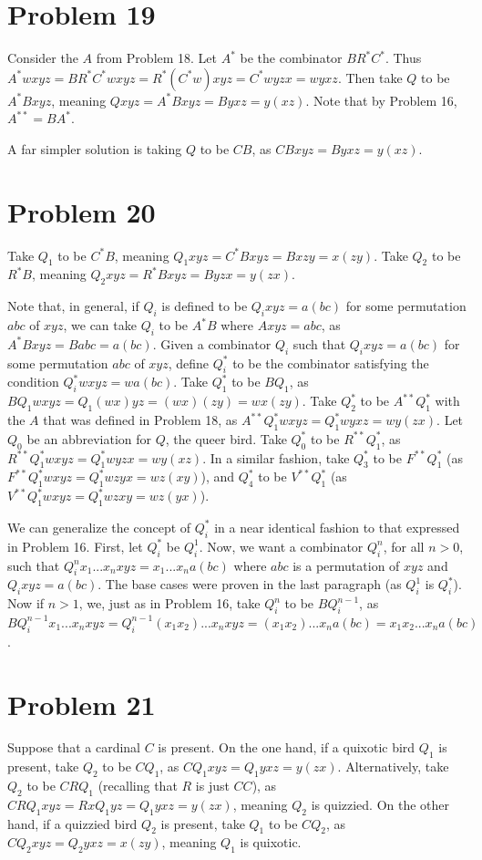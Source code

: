 \documentclass{article}
\theoremstyle{definition}
\begin{document}
\section*{Problem 19}
Consider the $A$ from Problem 18. Let $A^*$ be the combinator $BR^*C^*$. Thus $A^*wxyz=BR^*C^*wxyz=R^*(C^*w)xyz=C^*wyzx=wyxz$. Then take $Q$ to be 
$A^*Bxyz$, meaning $Qxyz=A^*Bxyz=Byxz=y(xz)$. Note that by Problem 16, $A^{**}=BA^*$.


A far simpler solution is taking $Q$ to be $CB$, as $CBxyz=Byxz=y(xz)$.

\section*{Problem 20}
Take $Q_1$ to be $C^*B$, meaning $Q_1xyz=C^*Bxyz=Bxzy=x(zy)$. Take $Q_2$ to be $R^*B$, meaning $Q_2xyz=R^*Bxyz=Byzx=y(zx)$.


Note that, in general, if $Q_i$ is defined to be $Q_ixyz=a(bc)$ for some permutation $abc$ of $xyz$, we can take $Q_i$ to be $A^*B$ where $Axyz=abc$, as 
$A^*Bxyz=Babc=a(bc)$. Given a combinator $Q_i$ such that $Q_ixyz=a(bc)$ for some permutation $abc$ of $xyz$, define $Q_i^*$ to be the combinator satisfying the condition 
$Q_i^*wxyz=wa(bc)$. Take $Q_1^*$ to be $BQ_1$, as $BQ_1wxyz=Q_1(wx)yz=(wx)(zy)=wx(zy)$. Take $Q_2^*$ to be $A^{**}Q_1^*$ with the $A$ that was defined in Problem 18, as 
$A^{**}Q_1^*wxyz=Q_1^*wyxz=wy(zx)$. Let $Q_0$ be an abbreviation for $Q$, the queer bird. Take $Q_0^*$ to be $R^{**}Q_1^*$, as 
$R^{**}Q_1^*wxyz=Q_1^*wyzx=wy(xz)$. In a similar fashion, take $Q_3^*$ to be $F^{**}Q_1^*$ (as $F^{**}Q_1^*wxyz=Q_1^*wzyx=wz(xy)$), 
and $Q_4^*$ to be $V^{**}Q_1^*$ (as $V^{**}Q_1^*wxyz=Q_1^*wzxy=wz(yx)$).


We can generalize the concept of $Q_i^*$ in a near identical fashion to that expressed in Problem 16. First, let $Q_i^*$ be $Q_i^1$. Now, we want a combinator $Q_i^n$, for all 
$n>0$, 
such that $Q_i^nx_1...x_nxyz=x_1...x_na(bc)$ where $abc$ is a permutation of $xyz$ and $Q_ixyz=a(bc)$. The base cases were proven in the last paragraph (as $Q_i^1$ 
is $Q_i^*$). Now if $n>1$, we, just as in Problem 16, take $Q_i^n$ to be $BQ_i^{n-1}$, as 
$BQ_i^{n-1}x_1...x_nxyz=Q_i^{n-1}(x_1x_2)...x_nxyz=(x_1x_2)...x_na(bc)=x_1x_2...x_na(bc)$.

\section*{Problem 21}
Suppose that a cardinal $C$ is present. On the one hand, if a quixotic bird $Q_1$ is present, take $Q_2$ to be $CQ_1$, as $CQ_1xyz=Q_1yxz=y(zx)$. 
Alternatively, take $Q_2$ to be $CRQ_1$ (recalling that $R$ is just $CC$), as 
$CRQ_1xyz=RxQ_1yz=Q_1yxz=y(zx)$, meaning $Q_2$ is quizzied. On the other hand, if a quizzied bird $Q_2$ is present, take $Q_1$ to be $CQ_2$, as 
$CQ_2xyz=Q_2yxz=x(zy)$, meaning $Q_1$ is quixotic.   
\end{document}
